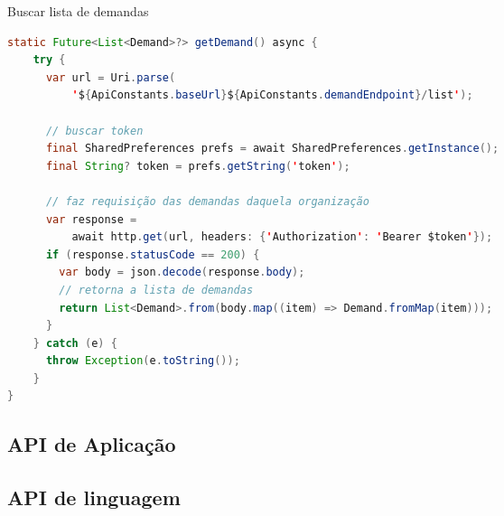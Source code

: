 \begin{sourcecode}[htb][h!]
    \caption{\label{codigo:list-demands}Buscar lista de demandas}
    \begin{lstlisting}[frame=single, language=Java]
static Future<List<Demand>?> getDemand() async {
    try {
      var url = Uri.parse(
          '${ApiConstants.baseUrl}${ApiConstants.demandEndpoint}/list');
		  
	  // buscar token
      final SharedPreferences prefs = await SharedPreferences.getInstance();
      final String? token = prefs.getString('token');
	  
	  // faz requisição das demandas daquela organização
      var response =
          await http.get(url, headers: {'Authorization': 'Bearer $token'});
      if (response.statusCode == 200) {
        var body = json.decode(response.body);
		// retorna a lista de demandas
        return List<Demand>.from(body.map((item) => Demand.fromMap(item)));
      }
    } catch (e) {
	  throw Exception(e.toString());
    }
}
\end{lstlisting}
    \fonte{}
\end{sourcecode}

\subsection{API de Aplicação}\label{subsec:api-aplicacao}

\subsection{API de linguagem}\label{subsec:api-linguagens}




